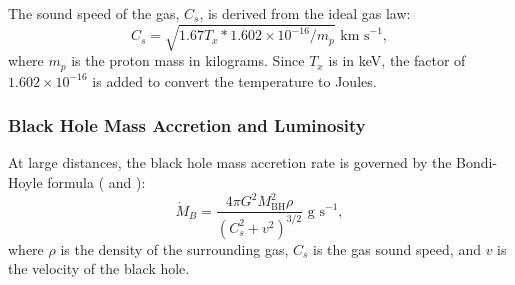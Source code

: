 \documentclass[fleqn,usenatbib,useAMS]{mnras}
\begin{document}
The sound speed of the gas, $C_s$, is derived from the ideal gas law:
\begin{equation}\label{gas_sound_speed}
    C_s = \sqrt{1.67T_x*1.602\times10^{-16}/m_p} \text{  km s}^{-1},
\end{equation}
where $m_p$ is the proton mass in kilograms.  Since $T_x$ is in keV, the factor of $1.602\times10^{-16}$ is added to convert the temperature to Joules.

\subsubsection{Black Hole Mass Accretion and Luminosity}
At large distances, the black hole mass accretion rate is governed by the Bondi-Hoyle formula (\citealt{1944MNRAS.104..273B} and \citealt{1952MNRAS.112..195B}):
\begin{equation}\label{net_accretion}
    \dot{M}_{B} = \frac{4{\pi}G^2M_\mathrm{BH}^2\rho}{(C_s^2+v^2)^{3/2}} \text{  g}\text{ s}^{-1},
\end{equation}
where $\rho$ is the density of the surrounding gas, $C_s$ is the gas sound speed, and $v$ is the velocity of the black hole.
\end{document}
